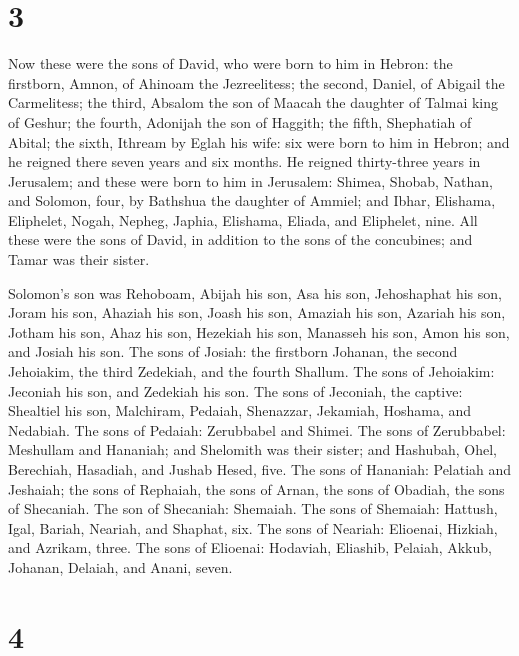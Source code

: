 \hypertarget{section-2}{%
\section{3}\label{section-2}}

 Now these were the sons of David, who were born to him in
Hebron: the firstborn, Amnon, of Ahinoam the Jezreelitess; the second,
Daniel, of Abigail the Carmelitess;  the third, Absalom the
son of Maacah the daughter of Talmai king of Geshur; the fourth,
Adonijah the son of Haggith;  the fifth, Shephatiah of
Abital; the sixth, Ithream by Eglah his wife:  six were born
to him in Hebron; and he reigned there seven years and six months. He
reigned thirty-three years in Jerusalem;  and these were
born to him in Jerusalem: Shimea, Shobab, Nathan, and Solomon, four, by
Bathshua the daughter of Ammiel;  and Ibhar, Elishama,
Eliphelet,  Nogah, Nepheg, Japhia,  Elishama,
Eliada, and Eliphelet, nine.  All these were the sons of
David, in addition to the sons of the concubines; and Tamar was their
sister.

 Solomon's son was Rehoboam, Abijah his son, Asa his son,
Jehoshaphat his son,  Joram his son, Ahaziah his son, Joash
his son,  Amaziah his son, Azariah his son, Jotham his son,
 Ahaz his son, Hezekiah his son, Manasseh his son,
 Amon his son, and Josiah his son.  The sons
of Josiah: the firstborn Johanan, the second Jehoiakim, the third
Zedekiah, and the fourth Shallum.  The sons of Jehoiakim:
Jeconiah his son, and Zedekiah his son.  The sons of
Jeconiah, the captive: Shealtiel his son,  Malchiram,
Pedaiah, Shenazzar, Jekamiah, Hoshama, and Nedabiah.  The
sons of Pedaiah: Zerubbabel and Shimei. The sons of Zerubbabel:
Meshullam and Hananiah; and Shelomith was their sister; 
and Hashubah, Ohel, Berechiah, Hasadiah, and Jushab Hesed, five.
 The sons of Hananiah: Pelatiah and Jeshaiah; the sons of
Rephaiah, the sons of Arnan, the sons of Obadiah, the sons of Shecaniah.
 The son of Shecaniah: Shemaiah. The sons of Shemaiah:
Hattush, Igal, Bariah, Neariah, and Shaphat, six.  The sons
of Neariah: Elioenai, Hizkiah, and Azrikam, three.  The
sons of Elioenai: Hodaviah, Eliashib, Pelaiah, Akkub, Johanan, Delaiah,
and Anani, seven.

\hypertarget{section-3}{%
\section{4}\label{section-3}}

